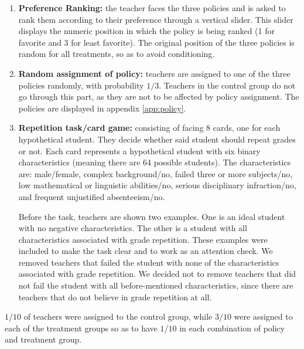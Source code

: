\documentclass[12pt,a4paper]{article}
\begin{document}
\begin{enumerate}
	\item \textbf{Preference Ranking:} the teacher faces the three policies and is asked to rank them according to their preference through a vertical slider. This slider displays the numeric position in which the policy is being ranked (1 for favorite and 3 for least favorite). The original position of the three policies is random for all treatments, so as to avoid conditioning. 
	
	\item \textbf{Random assignment of policy:} teachers are assigned to one of the three policies randomly, with probability $1/3$. Teachers in the control group do not go through this part, as they are not to be affected by policy assignment. The policies are displayed in appendix \ref{app:policy}.
	
	\item \textbf{Repetition task/card game:} consisting of facing 8 cards, one for each hypothetical student. They decide whether said student should repeat grades or not. Each card represents a hypothetical student with six binary characteristics (meaning there are 64 possible students). The characteristics are: male/female, complex background/no, failed three or more subjects/no, low mathematical or linguistic abilities/no, serious disciplinary infraction/no, and frequent unjustified absenteeism/no. 
	
	Before the task, teachers are shown two examples. One is an ideal student with no negative characteristics. The other is a student with all characteristics associated with grade repetition. These examples were included to make the task clear and to work as an attention check. We removed teachers that failed the student with none of the characteristics associated with grade repetition. We decided not to remove teachers that did not fail the student with all before-mentioned characteristics, since there are teachers that do not believe in grade repetition at all.
	
\end{enumerate}

$1/10$ of teachers were assigned to the control group, while $3/10$ were assigned to each of the treatment groups so as to have $1/10$ in each combination of policy and treatment group.

\end{document}
